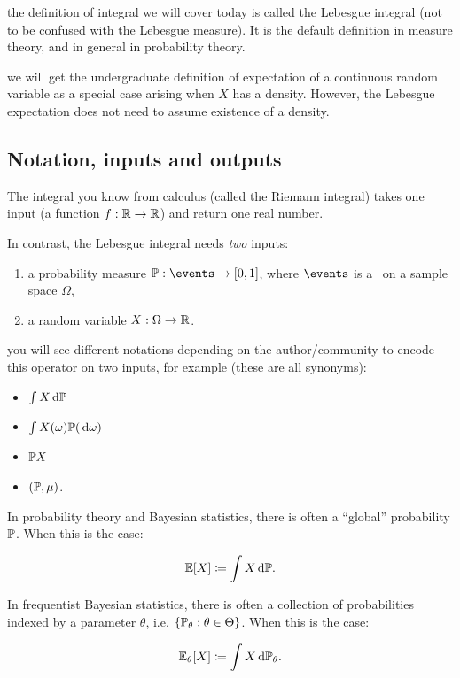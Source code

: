 \documentclass{article}
\begin{document}
 the definition of integral we will cover today is called the Lebesgue integral (not to be confused with the Lebesgue measure). It is the default definition in measure theory, and in general in probability theory.

 we will get the undergraduate definition of expectation of a continuous random variable as a special case arising when $X$ has a density. However, the Lebesgue expectation does not need to assume existence of a density.


\subsection{Notation, inputs and outputs}

The integral you know from calculus (called the Riemann integral) takes one input (a function $f : \R \to \R$) and return one real number.

In contrast, the Lebesgue integral needs \emph{two} inputs:
\begin{enumerate}
  \item a probability measure $\P : \events \to [0, 1]$, where $\events$ is a \sigmaalg\ on a sample space $\Omega$,
  \item a random variable $X : \Omega \to \R$.
\end{enumerate}

 you will see different notations depending on the author/community to encode this operator on two inputs, for example (these are all synonyms):
\begin{itemize}
  \item $\int X \ud \P$
  \item $\int X(\omega) \P(\ud \omega)$
  \item $\P X$
  \item $(\P, \mu)$.
\end{itemize}

In probability theory and Bayesian statistics, there is often a ``global'' probability $\P$. When this is the case:

\[ \E[X] \defeq \int X \ud \P. \]

In frequentist Bayesian statistics, there is often a collection of probabilities indexed by a parameter $\theta$, i.e. $\{\P_\theta : \theta \in \Theta\}$. When this is the case:

\[ \E_\theta[X] \defeq \int X \ud \P_\theta. \]
\end{document}
